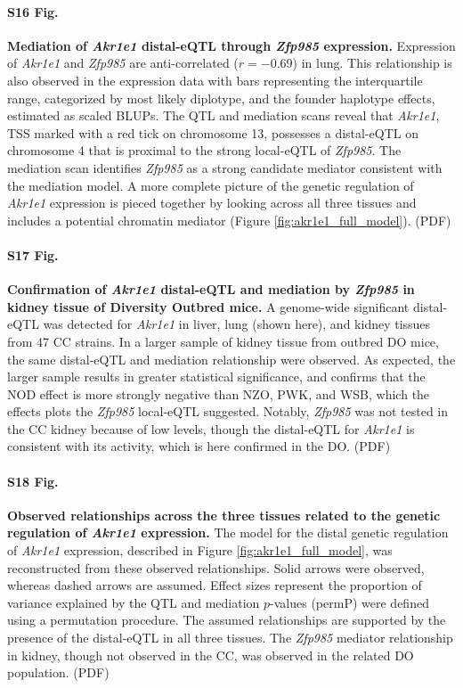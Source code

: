 \documentclass[10pt,letterpaper]{article}
\begin{document}
\paragraph*{S16 Fig.}
\label{S_akr1e1_exmediation}
{\bf Mediation of \textit{Akr1e1} distal-eQTL through \textit{Zfp985} expression.}
Expression of \textit{Akr1e1} and \textit{Zfp985} are anti-correlated ($r = -0.69$) in lung. This relationship is also observed in the expression data with bars representing the interquartile range, categorized by most likely diplotype, and the founder haplotype effects, estimated as scaled BLUPs. The QTL and mediation scans reveal that \textit{Akr1e1}, TSS marked with a red tick on chromosome 13, possesses a distal-eQTL on chromosome 4 that is proximal to the strong local-eQTL of \textit{Zfp985}. The mediation scan identifies \textit{Zfp985} as a strong candidate mediator consistent with the mediation model. A more complete picture of the genetic regulation of \textit{Akr1e1} expression is pieced together by looking across all three tissues and includes a potential chromatin mediator (Figure \ref{fig:akr1e1_full_model}). (PDF)

\paragraph*{S17 Fig.}
\label{S_do_akr1e1}
{\bf Confirmation of \textit{Akr1e1} distal-eQTL and mediation by \textit{Zfp985} in kidney tissue of Diversity Outbred mice.}
A genome-wide significant distal-eQTL was detected for \textit{Akr1e1} in liver, lung (shown here), and kidney tissues from 47 CC strains. In a larger sample of kidney tissue from outbred DO mice, the same distal-eQTL and mediation relationship were observed. As expected, the larger sample results in greater statistical significance, and confirms that the NOD effect is more strongly negative than NZO, PWK, and WSB, which the effects plots the \textit{Zfp985} local-eQTL suggested. Notably, \textit{Zfp985} was not tested in the CC kidney because of low levels, though the distal-eQTL for \textit{Akr1e1} is consistent with its activity, which is here confirmed in the DO. (PDF)

\paragraph*{S18 Fig.}
\label{S_akr1e1_relationships}
{\bf Observed relationships across the three tissues related to the genetic regulation of \textit{Akr1e1} expression.}
The model for the distal genetic regulation of \textit{Akr1e1} expression, described in Figure \ref{fig:akr1e1_full_model}, was reconstructed from these observed relationships. Solid arrows were observed, whereas dashed arrows are assumed. Effect sizes represent the proportion of variance explained by the QTL and mediation $p$-values (permP) were defined using a permutation procedure. The assumed relationships are supported by the presence of the distal-eQTL in all three tissues. The \textit{Zfp985} mediator relationship in kidney, though not observed in the CC, was observed in the related DO population. (PDF)
\end{document}

